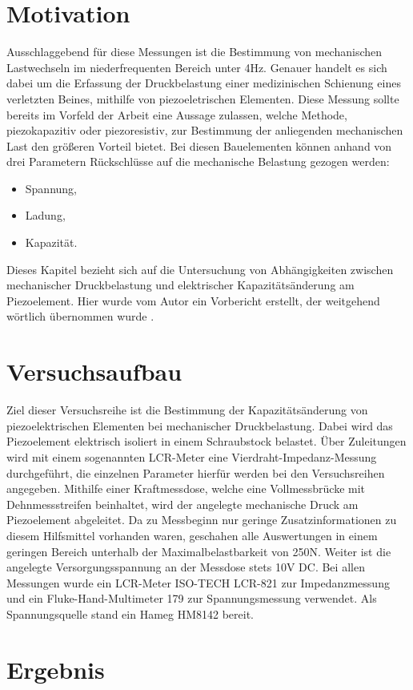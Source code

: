 \documentclass[12pt]{scrreprt} %
\begin{document}
\section{Motivation}
Ausschlaggebend für diese Messungen ist die Bestimmung von mechanischen Lastwechseln im niederfrequenten Bereich unter 4Hz. Genauer handelt es sich dabei um die Erfassung der Druckbelastung einer medizinischen Schienung eines verletzten Beines, mithilfe von piezoeletrischen Elementen. Diese Messung sollte bereits im Vorfeld der Arbeit eine Aussage zulassen, welche Methode, piezokapazitiv oder piezoresistiv, zur Bestimmung der anliegenden mechanischen Last den größeren Vorteil bietet. Bei diesen Bauelementen können anhand von drei Parametern Rückschlüsse auf die mechanische Belastung gezogen werden:
\begin{itemize}
\item Spannung,
\item Ladung,
\item Kapazität.
\end{itemize}
Dieses Kapitel bezieht sich auf die Untersuchung von Abhängigkeiten zwischen mechanischer Druckbelastung und elektrischer Kapazitätsänderung am Piezoelement. Hier wurde vom Autor ein Vorbericht erstellt, der weitgehend wörtlich übernommen wurde \citep{Jobstmann2012}.
\section{Versuchsaufbau}

Ziel dieser Versuchsreihe ist die Bestimmung der Kapazitätsänderung von piezoelektrischen Elementen bei mechanischer Druckbelastung. Dabei wird das Piezoelement elektrisch isoliert in einem Schraubstock belastet. Über Zuleitungen wird mit einem sogenannten LCR-Meter eine Vierdraht-Impedanz-Messung durchgeführt, die einzelnen Parameter hierfür werden bei den Versuchsreihen angegeben. Mithilfe einer Kraftmessdose, welche eine Vollmessbrücke mit Dehnmessstreifen beinhaltet, wird der angelegte mechanische Druck am Piezoelement abgeleitet. Da zu Messbeginn nur geringe Zusatzinformationen zu diesem Hilfsmittel vorhanden waren, geschahen alle Auswertungen in einem geringen Bereich unterhalb der Maximalbelastbarkeit von 250N. Weiter ist die angelegte Versorgungsspannung an der Messdose stets 10V DC. Bei allen Messungen wurde ein LCR-Meter ISO-TECH LCR-821 zur Impedanzmessung und ein Fluke-Hand-Multimeter 179 zur Spannungsmessung verwendet. Als Spannungsquelle stand ein Hameg HM8142 bereit.

\section{Ergebnis}
\end{document}

